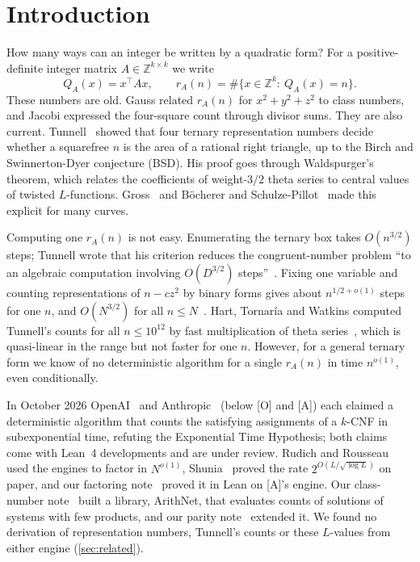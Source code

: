\documentclass[10pt]{amsart}
\theoremstyle{plain}
\theoremstyle{definition}
\theoremstyle{remark}
\numberwithin{equation}{section}
\newcommand{\A}{\textup{[A]}}
\newcommand{\Oa}{\textup{[O]}}
\newcommand{\Z}{\mathbb{Z}}
\begin{document}
\maketitle

\section{Introduction}\label{sec:intro}

How many ways can an integer be written by a quadratic form? For a positive-definite integer matrix
$A\in\Z^{k\times k}$ we write
\[
  Q_A(x)=x^{\top}Ax,\qquad r_A(n)=\#\{x\in\Z^k:\ Q_A(x)=n\}.
\]
These numbers are old. Gauss related $r_A(n)$ for $x^2+y^2+z^2$ to class numbers, and Jacobi expressed
the four-square count through divisor sums. They are also current. Tunnell~\cite{Tun83} showed that four
ternary representation numbers decide whether a squarefree $n$ is the area of a rational right triangle,
up to the Birch and Swinnerton-Dyer conjecture (BSD). His proof goes through Waldspurger's theorem, which
relates the coefficients of weight-$3/2$ theta series to central values of twisted $L$-functions. Gross~\cite{Gro87}
and B\"ocherer and Schulze-Pillot~\cite{BSP90} made this explicit for many curves.

Computing one $r_A(n)$ is not easy. Enumerating the ternary box takes $O(n^{3/2})$ steps; Tunnell wrote
that his criterion reduces the congruent-number problem ``to an algebraic computation involving
$O(D^{3/2})$ steps''~\cite[p.~325]{Tun83}. Fixing one variable and counting representations of $n-cz^2$ by binary
forms gives about $n^{1/2+o(1)}$ steps for one $n$, and $O(N^{3/2})$ for all $n\le N$~\cite[\S1.3]{HTW10}. Hart, Tornar\'ia and Watkins computed
Tunnell's counts for all $n\le10^{12}$ by fast multiplication of theta series~\cite{HTW10}, which is
quasi-linear in the range but not faster for one $n$. However, for a general ternary form we know of no
deterministic algorithm for a single $r_A(n)$ in time $n^{o(1)}$, even conditionally.

In October 2026 OpenAI~\cite{OpenAI26} and Anthropic~\cite{Anthropic26} (below \Oa{} and \A) each
claimed a deterministic algorithm that counts the satisfying assignments of a $k$-CNF in subexponential
time, refuting the Exponential Time Hypothesis; both claims come with Lean~4 developments and are under
review. Rudich and Rousseau~\cite{RR26} used the engines to factor in $N^{o(1)}$, Shunia~\cite{Shu26}
proved the rate $2^{O(L/\sqrt{\log L})}$ on paper, and our factoring note~\cite{TulFac26} proved it in Lean
on \A's engine. Our class-number note~\cite{TulCN26} built a library, ArithNet, that evaluates counts of
solutions of systems with few products, and our parity note~\cite{TulPar26} extended it. We found no
derivation of representation numbers, Tunnell's counts or these $L$-values from either engine
(\cref{sec:related}).
\end{document}
